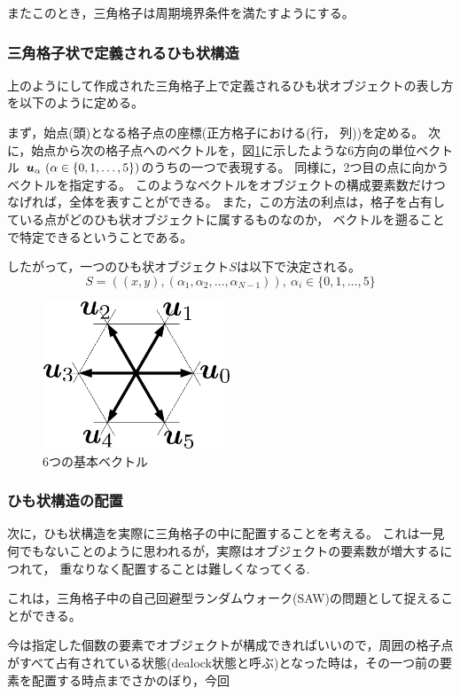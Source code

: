 またこのとき，三角格子は周期境界条件を満たすようにする。

\subsubsection{三角格子状で定義されるひも状構造}

上のようにして作成された三角格子上で定義されるひも状オブジェクトの表し方を以下のように定める。

まず，始点(頭)となる格子点の座標(正方格子における(行， 列))を定める。
次に，始点から次の格子点へのベクトルを，図\ref{fig:unitvec}に示したような6方向の単位ベクトル
$\mbox{\boldmath \(u\)}_{\alpha}\ (\alpha \in \{0, 1, \dots , 5\})$のうちの一つで表現する。
同様に，2つ目の点に向かうベクトルを指定する。
このようなベクトルをオブジェクトの構成要素数だけつなげれば，全体を表すことができる。
また，この方法の利点は，格子を占有している点がどのひも状オブジェクトに属するものなのか，
ベクトルを遡ることで特定できるということである。

したがって，一つのひも状オブジェクト$S$は以下で決定される。
$$ S = ((x, y), (\alpha_{1},  \alpha_{2}, \dots , \alpha_{N-1}) ), \ \alpha_{i} \in \{0, 1, \dots , 5\}$$

\begin{figure}[H]
  \begin{center}
    \includegraphics[width=0.5\textwidth]{../img/unitvec.pdf}
    \caption{6つの基本ベクトル}
    \label{fig:unitvec}
  \end{center}
\end{figure}

\subsubsection{ひも状構造の配置}

次に，ひも状構造を実際に三角格子の中に配置することを考える。
これは一見何でもないことのように思われるが，実際はオブジェクトの要素数が増大するにつれて，
重なりなく配置することは難しくなってくる.

これは，三角格子中の自己回避型ランダムウォーク(SAW)の問題として捉えることができる。

今は指定した個数の要素でオブジェクトが構成できればいいので，周囲の格子点がすべて占有されている状態(dealock状態と呼ぶ)となった時は，その一つ前の要素を配置する時点までさかのぼり，今回


